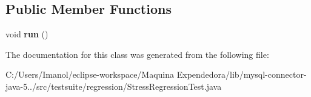 \subsection*{Public Member Functions}
\begin{DoxyCompactItemize}
\item 
\mbox{\label{classtestsuite_1_1regression_1_1_stress_regression_test_1_1_busy_thread_a2915a9211f51eddf7bdd522a7c285a97}} 
void {\bfseries run} ()
\end{DoxyCompactItemize}


The documentation for this class was generated from the following file\+:\begin{DoxyCompactItemize}
\item 
C\+:/\+Users/\+Imanol/eclipse-\/workspace/\+Maquina Expendedora/lib/mysql-\/connector-\/java-\/5../src/testsuite/regression/Stress\+Regression\+Test.\+java\end{DoxyCompactItemize}
